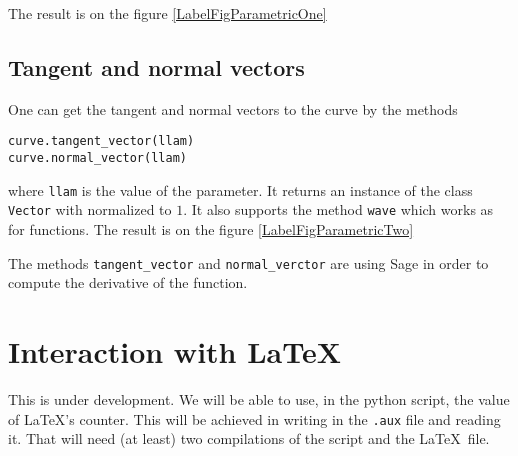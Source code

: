 The result is on the figure \ref{LabelFigParametricOne}
\newcommand{\CaptionFigParametricOne}{An example of parametric curve.}


\subsection{Tangent and normal vectors}

One can get the tangent and normal vectors to the curve by the methods
\begin{verbatim}
curve.tangent_vector(llam)
curve.normal_vector(llam)
\end{verbatim}
where \verb+llam+ is the value of the parameter. It returns an instance of the class \verb+Vector+ with normalized to $1$. It also supports the method \verb+wave+ which works as for functions.
The result is on the figure \ref{LabelFigParametricTwo}
\newcommand{\CaptionFigParametricTwo}{An other example of parametric curve. Si je voulais troller, j'offrirais un casier de trapistes à qui ferait cette figure en \LaTeX-pstricks pur sans faire appel à des programmes externes.}


The methods \verb+tangent_vector+ and \verb+normal_verctor+ are using Sage in order to compute the derivative of the function.

\section{Interaction with \LaTeX}

This is under development. We will be able to use, in the python script, the value of \LaTeX's counter. This will be achieved in writing in the \verb+.aux+ file and reading it. That will need (at least) two compilations of the script and the \LaTeX\ file.


\setcounter{phyess}{\value{equation}}
\label{Labelphyess}

